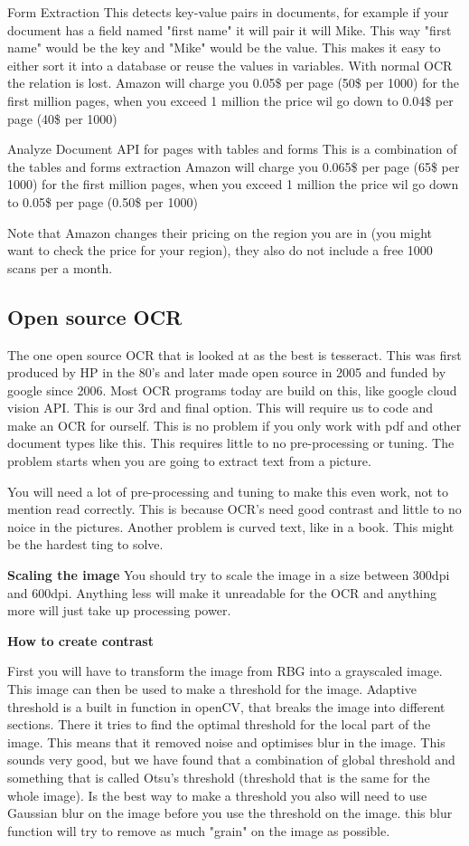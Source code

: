 Form Extraction
This detects key-value pairs in documents, for example if your document has a field named "first name" it will pair it will Mike.
This way "first name" would be the key and "Mike" would be the value.
This makes it easy to either sort it into a database or reuse the values in variables.
With normal OCR the relation is lost.
Amazon will charge you 0.05\$ per page (50\$ per 1000) for the first million pages, when you exceed 1 million the price wil go down to
0.04\$ per page (40\$ per 1000)

Analyze Document API for pages with tables and forms
This is a combination of the tables and forms extraction
Amazon will charge you 0.065\$ per page (65\$ per 1000) for the first million pages, when you exceed 1 million the price wil go down to
0.05\$ per page (0.50\$ per 1000)

Note that Amazon changes their pricing on the region you are in (you might want to check the price for your region), they also do not include a free 1000 scans per a month.

\subsection{Open source OCR}\label{subsec:Open source}
The one open source OCR that is looked at as the best is tesseract.
This was first produced by HP in the 80's and later made open source in 2005 and funded by google since 2006.
Most OCR programs today are build on this, like google cloud vision API. This is our 3rd and final option.
This will require us to code and make an OCR for ourself.
This is no problem if you only work with pdf and other document types like this.
This requires little to no pre-processing or tuning.
The problem starts when you are going to extract text from a picture.

You will need a lot of pre-processing and tuning to make this even work, not to mention read correctly.
This is because OCR's need good contrast and little to no noice in the pictures.
Another problem is curved text, like in a book.
This might be the hardest ting to solve.

\textbf{Scaling the image}
You should try to scale the image in a size between 300dpi and 600dpi.
Anything less will make it unreadable for the OCR and anything more will just take up processing power.

\textbf{How to create contrast}


First you will have to transform the image from RBG into a grayscaled image.
This image can then be used to make a threshold for the image.
Adaptive threshold is a built in function in openCV, that breaks the image into different sections.
There it tries to find the optimal threshold for the local part of the image.
This means that it removed noise and optimises blur in the image.
This sounds very good, but we have found that a combination of global threshold and something that is called Otsu's threshold (threshold that is the same for the whole image).
Is the best way to make a threshold you also will need to use Gaussian blur on the image before you use the threshold on the image.
this blur function will try to remove as much "grain" on the image as possible.

